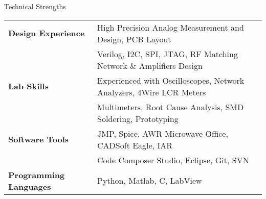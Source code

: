 \documentclass{resume} %
\begin{document}

\begin{rSection}{Technical Strengths}

\begin{tabular}{ @{} >{\bfseries}l @{\hspace{6ex}} l }
Design Experience & High Precision Analog Measurement and Design, PCB Layout \\
& Verilog, I2C, SPI, JTAG, RF Matching Network \& Amplifiers Design\smallskip \\

Lab Skills & Experienced with Oscilloscopes, Network Analyzers, 4Wire LCR Meters\\
& Multimeters, Root Cause Analysis, SMD Soldering, Prototyping \smallskip \\

Software Tools & JMP, Spice, AWR Microwave Office, CADSoft Eagle, IAR\\ 
 & Code Composer Studio, Eclipse, Git, SVN \smallskip \\

Programming Languages & Python, Matlab, C, LabView \smallskip \\ 

\end{tabular}

\end{rSection}
\medskip
\end{document}
